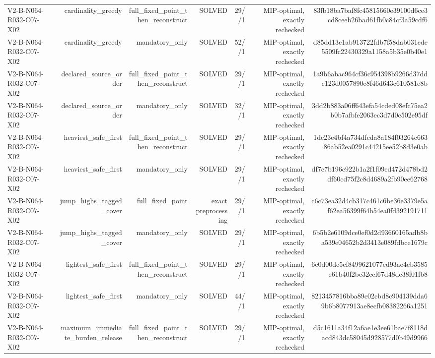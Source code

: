 {\begin{longtable}{lrrrrrr}
V2-B-N064-R032-C07-X02 & cardinality\_greedy & full\_fixed\_point\_then\_reconstruct & SOLVED & 29//1 & MIP-optimal, exactly rechecked & 83fb18ba7baf8fc45815660e39100d6ce3cd8ceeb26bad61fb0c84cf3a59cdf6 \\
V2-B-N064-R032-C07-X02 & cardinality\_greedy & mandatory\_only & SOLVED & 52//1 & MIP-optimal, exactly rechecked & d85dd13c1ab913722fdb7f58dab031cde5509fc22430329a1158a5b35e0b40e1 \\
V2-B-N064-R032-C07-X02 & declared\_source\_order & full\_fixed\_point\_then\_reconstruct & SOLVED & 29//1 & MIP-optimal, exactly rechecked & 1a9b6abac964cf36c954398b9266d37ddc123d0057890e8f46d643c610581e8b \\
V2-B-N064-R032-C07-X02 & declared\_source\_order & mandatory\_only & SOLVED & 32//1 & MIP-optimal, exactly rechecked & 3dd2b883a06ff643efa54cded08efc75ea2b0b7afbfe2063ec3d7d0c502e95df \\
V2-B-N064-R032-C07-X02 & heaviest\_safe\_first & full\_fixed\_point\_then\_reconstruct & SOLVED & 29//1 & MIP-optimal, exactly rechecked & 1dc23e4bf4a734dfcda8a184f03264c66386ab52ea0291c44215ee52b8d3e0ab \\
V2-B-N064-R032-C07-X02 & heaviest\_safe\_first & mandatory\_only & SOLVED & 29//1 & MIP-optimal, exactly rechecked & df7c7b196c922b1a2f1f09ed472d478bd2df60cd75f2c8d4689a2fb90ee62768 \\
V2-B-N064-R032-C07-X02 & jump\_highs\_tagged\_cover & full\_fixed\_point & exact preprocessing & 29//1 & MIP-optimal, exactly rechecked & c6c73ea32d4cb317c461c6be36e3379e5af62ea56399f64b54ea0fd392191711 \\
V2-B-N064-R032-C07-X02 & jump\_highs\_tagged\_cover & mandatory\_only & SOLVED & 29//1 & MIP-optimal, exactly rechecked & 6b5b2e6109dce0ef0d2d93660165adb8ba539e04652b2d3413e089fdbce1679c \\
V2-B-N064-R032-C07-X02 & lightest\_safe\_first & full\_fixed\_point\_then\_reconstruct & SOLVED & 29//1 & MIP-optimal, exactly rechecked & 6c0d00dc5cf8499621077ed93ae4eb3585e61b40f2bc32ccf67d48de38f01fb8 \\
V2-B-N064-R032-C07-X02 & lightest\_safe\_first & mandatory\_only & SOLVED & 44//1 & MIP-optimal, exactly rechecked & 8213457816bba89c02cbd8c904139dda69b6b8077913ae8ecfb08382266a1251 \\
V2-B-N064-R032-C07-X02 & maximum\_immediate\_burden\_release & full\_fixed\_point\_then\_reconstruct & SOLVED & 29//1 & MIP-optimal, exactly rechecked & d5c1611a34f12a6ae1e3ee61bae7f8118dacd843dc58045d928577d0b49d9966 \\

\end{longtable}}
